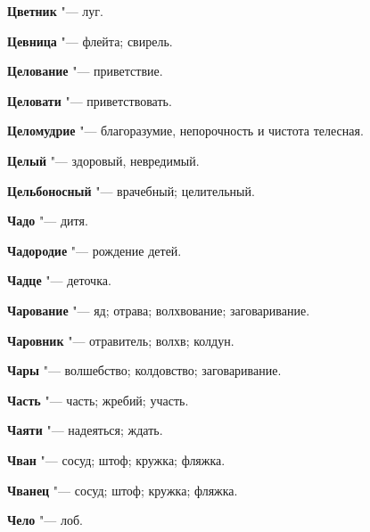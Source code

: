 \begin{mymulticols}{2}
\noindent\textbf{Цветник} "--- луг. 




\noindent\textbf{Цевница} "--- флейта; свирель. 




\noindent\textbf{Целование} "--- приветствие. 




\noindent\textbf{Целовати} "--- приветствовать. 




\noindent\textbf{Целомудрие} "--- благоразумие, непорочность и чистота телесная. 




\noindent\textbf{Целый} "--- здоровый, невредимый. 




\noindent\textbf{Цельбоносный} "--- врачебный; целительный. 




\bukvaending






\noindent\textbf{Чадо} "--- дитя. 




\noindent\textbf{Чадородие} "--- рождение детей. 




\noindent\textbf{Чадце} "--- деточка. 




\noindent\textbf{Чарование} "--- яд; отрава; волхвование; заговаривание. 




\noindent\textbf{Чаровник} "--- отравитель; волхв; колдун. 




\noindent\textbf{Чары} "--- волшебство; колдовство; заговаривание. 




\noindent\textbf{Часть} "--- часть; жребий; участь. 




\noindent\textbf{Чаяти} "--- надеяться; ждать. 




\noindent\textbf{Чван} "--- сосуд; штоф; кружка; фляжка. 




\noindent\textbf{Чванец} "--- сосуд; штоф; кружка; фляжка. 




\noindent\textbf{Чело} "--- лоб. 





\end{mymulticols}
